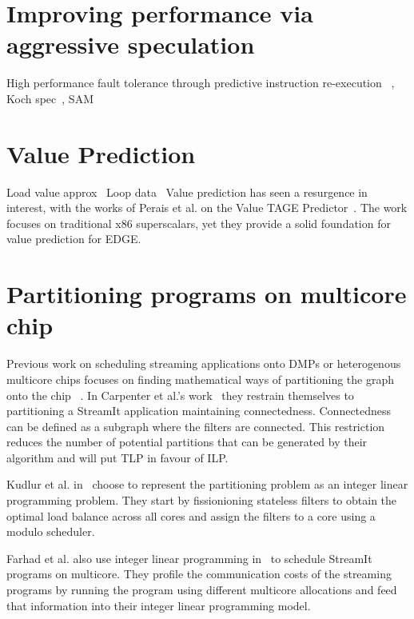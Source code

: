 \section{Improving performance via aggressive speculation}
High performance fault tolerance through predictive instruction re-execution ~\cite{soman2017predinst}, Koch spec~\cite{koch2013spec}, SAM~\cite{Abeydeera2017SpecMulti}


\section{Value Prediction}
Load value approx~\cite{miguel2014LoadVal}
Loop data~\cite{murphy2016loopdata}
Value prediction has seen a resurgence in interest, with the works of Perais et al. on the Value TAGE Predictor~\cite{peraisBeBop2015,peraisVTAGE2014}.
The work focuses on traditional x86 superscalars, yet they provide a solid foundation for value prediction for EDGE.


\section{Partitioning programs on multicore chip}

Previous work on scheduling streaming applications onto DMPs or heterogenous multicore chips focuses on finding mathematical ways of partitioning the graph onto the chip ~\cite{carpenter2009streammap,kudlur2008orchestratingstreamprog}.  
In Carpenter et al.'s work~\cite{carpenter2009streammap} they restrain themselves to partitioning a StreamIt application maintaining connectedness.
Connectedness can be defined as a subgraph where the filters are connected. 
This restriction reduces the number of potential partitions that can be generated by their algorithm and will put TLP in favour of ILP. 

Kudlur et al. in~\cite{kudlur2008orchestratingstreamprog} choose to represent the partitioning problem as an integer linear programming problem.
They start by fissionioning stateless filters to obtain the optimal load balance across all cores and assign the filters to a core using a modulo scheduler.

Farhad et al. also use integer linear programming in~\cite{farhad2012streamilp} to schedule StreamIt programs on multicore.
They profile the communication costs of the streaming programs by running the program using different multicore allocations and feed that information into their integer linear programming model.


